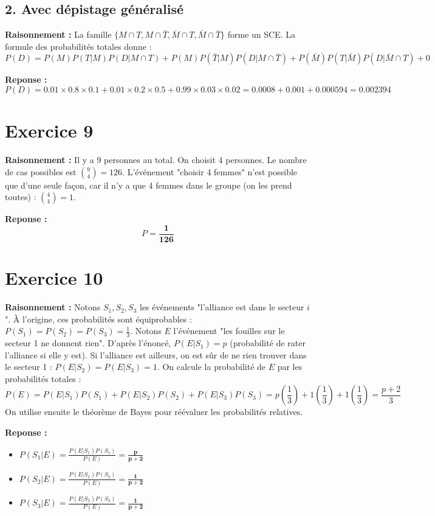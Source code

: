 \documentclass[11pt,a4paper]{article}
\begin{document}
\subsection*{2. Avec dépistage généralisé}

\textbf{Raisonnement :} La famille $\{M \cap T, M \cap \bar{T}, \bar{M} \cap T, \bar{M} \cap \bar{T}\}$ forme un SCE. La formule des probabilités totales donne :
$$P(D) = P(M)P(T|M)P(D|M \cap T) + P(M)P(\bar{T}|M)P(D|M \cap \bar{T}) + P(\bar{M})P(T|\bar{M})P(D|\bar{M} \cap T) + 0$$

\textbf{Reponse :} 
$$ P(D) = 0.01 \times 0.8 \times 0.1 + 0.01 \times 0.2 \times 0.5 + 0.99 \times 0.03 \times 0.02 = 0.0008 + 0.001 + 0.000594 = \mathbf{0.002394} $$

\hrulefill

\section*{Exercice 9}

\textbf{Raisonnement :} Il y a 9 personnes au total. On choisit 4 personnes. Le nombre de cas possibles est $\binom{9}{4} = 126$. L'événement "choisir 4 femmes" n'est possible que d'une seule façon, car il n'y a que 4 femmes dans le groupe (on les prend toutes) : $\binom{4}{4} = 1$.

\textbf{Reponse :} 
$$ P = \mathbf{\frac{1}{126}} $$

\hrulefill

\section*{Exercice 10}

\textbf{Raisonnement :} Notons $S_1, S_2, S_3$ les événements "l'alliance est dans le secteur $i$". À l'origine, ces probabilités sont équiprobables : $P(S_1) = P(S_2) = P(S_3) = \frac{1}{3}$.
Notons $E$ l'événement "les fouilles sur le secteur 1 ne donnent rien".
D'après l'énoncé, $P(E|S_1) = p$ (probabilité de rater l'alliance si elle y est). Si l'alliance est ailleurs, on est sûr de ne rien trouver dans le secteur 1 : $P(E|S_2) = P(E|S_3) = 1$.
On calcule la probabilité de $E$ par les probabilités totales :
$$ P(E) = P(E|S_1)P(S_1) + P(E|S_2)P(S_2) + P(E|S_3)P(S_3) = p(\frac{1}{3}) + 1(\frac{1}{3}) + 1(\frac{1}{3}) = \frac{p+2}{3} $$
On utilise ensuite le théorème de Bayes pour réévaluer les probabilités relatives.

\textbf{Reponse :}
\begin{itemize}
    \item $P(S_1|E) = \frac{P(E|S_1)P(S_1)}{P(E)} = \mathbf{\frac{p}{p+2}}$
    \item $P(S_2|E) = \frac{P(E|S_2)P(S_2)}{P(E)} = \mathbf{\frac{1}{p+2}}$
    \item $P(S_3|E) = \frac{P(E|S_3)P(S_3)}{P(E)} = \mathbf{\frac{1}{p+2}}$
\end{itemize}
\end{document}
